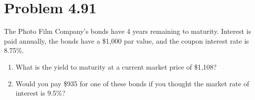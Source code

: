 \documentclass[../INDE250HW.tex]{subfiles}
\begin{document}
\newpage
\section*{Problem 4.91}
\begin{exrc}
    The Photo Film Company's bonds have 4 years remaining to maturity. Interest is paid annually, the bonds have a \$1,000 par value, and the coupon interest rate is 8.75\%.
    \begin{enumerate}
        \item What is the yield to maturity at a current market price of \$1,108?
        \item Would you pay \$935 for one of these bonds if you thought the market rate of interest is 9.5\%?
    \end{enumerate}
\end{exrc}
\end{document}
